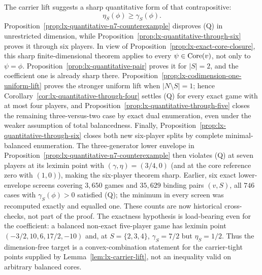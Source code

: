 The carrier lift suggests a sharp quantitative form of that contrapositive:
\begin{equation}
 \eta_S(\phi)\geq\gamma_S(\phi).
 \tag{Q}\label{eq:lx-quantitative-carrier}
\end{equation}
Proposition~\ref{prop:lx-quantitative-n7-counterexample} disproves (Q) in
unrestricted dimension, while Proposition~\ref{prop:lx-quantitative-through-six}
proves it through six players.  In view of
Proposition~\ref{prop:lx-exact-core-closure}, this sharp finite-dimensional
theorem applies to every $\psi\in\operatorname{Core}(v)$, not only to $\psi=\phi$.
Proposition~\ref{prop:lx-quantitative-pair} proves it for $|S|=2$, and the
coefficient one is already sharp there.  Proposition~\ref{prop:lx-codimension-one-uniform-lift}
proves the stronger uniform lift when $|N\setminus S|=1$; hence
Corollary~\ref{cor:lx-quantitative-through-four} settles (Q) for every exact
game with at most four players, and
Proposition~\ref{prop:lx-quantitative-through-five} closes the remaining
three-versus-two case by exact dual enumeration, even under the weaker
assumption of total balancedness.  Finally,
Proposition~\ref{prop:lx-quantitative-through-six} closes both new
six-player splits by complete minimal-balanced enumeration.  The
three-generator lower envelope in
Proposition~\ref{prop:lx-quantitative-n7-counterexample} then violates (Q) at
seven players at its leximin point with $(\gamma,\eta)=(3/4,0)$ (and at the
core reference zero with $(1,0)$), making the six-player theorem sharp.
Earlier, six exact lower-envelope screens
covering $3{,}650$ games and $35{,}629$ binding pairs $(v,S)$, all $746$ cases
with $\gamma_S(\phi)>0$ satisfied (Q); the minimum in every screen was
recomputed exactly and equalled one.  These counts are now historical
cross-checks, not part of the proof.  The
exactness hypothesis is load-bearing even for the coefficient: a balanced
non-exact five-player game has leximin point
$(-3/2,10,6,17/2,-10)$ and, at $S=\{2,3,4\}$,
$\gamma_S=7/2$ but $\eta_S=1/2$.  Thus the dimension-free target is a
convex-combination statement for the carrier-tight points supplied by
Lemma~\ref{lem:lx-carrier-lift}, not an inequality valid on arbitrary
balanced cores.

